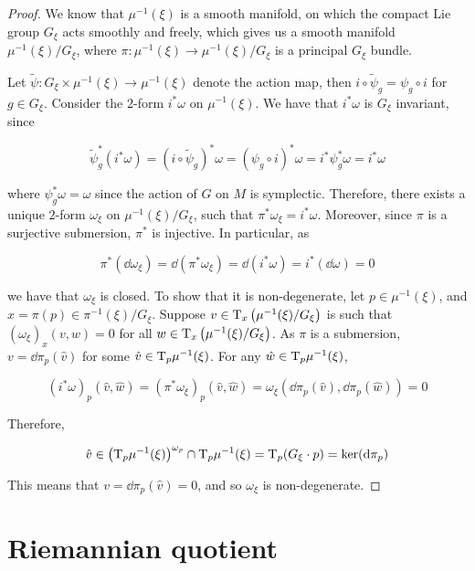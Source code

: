 \documentclass{article}
\begin{document}
\begin{proof}
    We know that \(\mu^{-1}(\xi)\) is a smooth manifold, on which the compact Lie group \(G_\xi\) acts smoothly and freely, which gives us a smooth manifold \(\mu^{-1}(\xi)/G_\xi\), where \(\pi : \mu^{-1}(\xi) \to \mu^{-1}(\xi)/G_\xi\) is a principal \(G_\xi\) bundle.

    Let \(\tilde \psi : G_\xi \times \mu^{-1}(\xi) \to \mu^{-1}(\xi)\) denote the action map, then \(i \circ \tilde\psi_g = \psi_g \circ i\) for \(g \in G_\xi\). Consider the \(2\)-form \(i^*\omega\) on \(\mu^{-1}(\xi)\). We have that \(i^*\omega\) is \(G_\xi\) invariant, since

    \[\tilde\psi_g^*(i^*\omega) = (i \circ \tilde \psi_g)^*\omega = (\psi_g \circ i)^*\omega = i^*\psi^*_g \omega = i^*\omega\]

    where \(\psi^*_g \omega = \omega\) since the action of \(G\) on \(M\) is symplectic. Therefore, there exists a unique \(2\)-form \(\omega_\xi\) on \(\mu^{-1}(\xi)/G_\xi\), such that \(\pi^*\omega_\xi = i^*\omega\). Moreover, since \(\pi\) is a surjective submersion, \(\pi^*\) is injective. In particular, as

    \[\pi^*(\dd\omega_\xi) = \dd(\pi^*\omega_\xi) = \dd(i^*\omega) = i^*(\dd\omega) = 0\]

    we have that \(\omega_\xi\) is closed. To show that it is non-degenerate, let \(p \in \mu^{-1}(\xi)\), and \(x = \pi(p) \in \pi^{-1}(\xi)/G_\xi\). Suppose \(v \in \mathrm{T}_x\left(\mu^{-1}(\xi)/G_\xi\right)\) is such that \((\omega_\xi)_x(v, w) = 0\) for all \(w\in \mathrm{T}_x\left(\mu^{-1}(\xi)/G_\xi\right)\). As \(\pi\) is a submersion, \(v = \dd\pi_p(\hat v)\) for some \(\hat v \in \mathrm{T}_p\mu^{-1}(\xi)\). For any \(\hat w \in \mathrm{T}_p\mu^{-1}(\xi)\),

    \[(i^*\omega)_p(\hat v, \hat w) = (\pi^*\omega_\xi)_p(\hat v, \hat w) = \omega_\xi(\dd\pi_p(\hat v), \dd\pi_p(\hat w)) = 0\]

    Therefore,

    \[\hat v \in \left(\mathrm{T}_p\mu^{-1}(\xi)\right)^{\omega_p} \cap \mathrm{T}_p\mu^{-1}(\xi) = \mathrm{T}_p(G_\xi \cdot p) = \ker(\dd\pi_p)\]

    This means that \(v = \dd\pi_p(\hat v) = 0\), and so \(\omega_\xi\) is non-degenerate.
\end{proof}

\section{Riemannian quotient}
\end{document}
